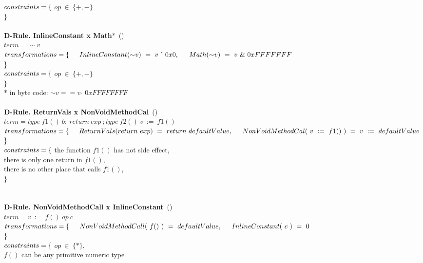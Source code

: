 $constraints = \{ \\$ 
\indent $op~\in~\{+, -\} $\\ 
$\}$
\\
\\
\textbf{D-Rule. InlineConstant x Math}*~(\pit{})\\
$term = {\sim}v $\\
$transformations = \{\\ 
\indent InlineConstant({\sim}v)~=~v~\hat{~}~0x0,\\ 
\indent Math({\sim}v)~=~v~\&~0xFFFFFFF$\\ \}\\
$constraints = \{ \\$ 
\indent $op~\in~\{+, -\} $\\ 
$\}$\\
* in byte code: ${\sim}v == v~\hat{~}~0xFFFFFFFF$
\\
\\
\textbf{D-Rule. ReturnVals x NonVoidMethodCal}~(\pit{})\\
$term = type~f1(){~b;~return~exp~};type~f2(){~v~:=~f1()~}$\\
$transformations = \{\\ 
\indent ReturnVals(return~exp)~=~return~defaultValue,\\ 
\indent NonVoidMethodCal(~v~:=~f1()~)~=~v~:=~defaultValue~$\\\}\\
$constraints = \{ \\$ 
\indent the function $f1()$ has not side effect, \\ 
\indent there is only one return in $f1()$, \\
\indent there is no other place that calls $f1()$, \\ 
$\}$\\
\\
\\
\textbf{D-Rule. NonVoidMethodCall x InlineConstant}~(\pit{})\\
$term = v~:=~f()~op~c $\\
$transformations = \{\\ 
\indent NonVoidMethodCall(~f()~)~=~defaultValue,\\ 
\indent InlineConstant(~c~)~=~0$\\\}\\
$constraints = \{ \\$ 
\indent $op~\in~\{*\}$, \\ 
\indent $f()$ can be any primitive numeric type \\
